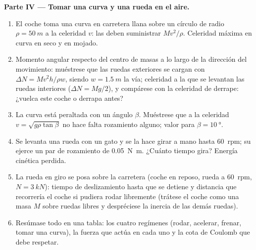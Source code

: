 \begin{problem}
\medskip
\noindent\textbf{Parte IV --- Tomar una curva y una rueda en el aire.}
\begin{enumerate}[resume]
  \item El coche toma una curva en carretera llana sobre un círculo de
        radio $\rho = \qty{50}{m}$ a la celeridad $v$: las  deben suministrar $Mv^2/\rho$. Celeridad máxima en
        curva en seco y en mojado.
  \item Momento angular respecto del centro de masas a lo largo de la
        dirección del movimiento: muéstrese que las ruedas exteriores se
        cargan con $\Delta N =
        Mv^2h/\rho w$, siendo $w = \qty{1.5}{m}$ la vía; celeridad a la que
        se levantan las ruedas interiores
        ($\Delta N = Mg/2$), y compárese con la celeridad de derrape:
        ¿vuelca este coche o derrapa antes?
  \item La curva está peraltada con un ángulo $\beta$. Muéstrese que a la
        celeridad $v = \sqrt{g\rho\tan\beta}$ no hace falta rozamiento
        alguno; valor para $\beta = \qty{10}{\degree}$.
  \item Se levanta una rueda con un gato y se la hace girar a mano hasta
        \qty{60}{rpm}; su  ejerce un par de rozamiento de
        \qty{0.05}{N.m}. ¿Cuánto tiempo gira? Energía cinética perdida.
  \item La rueda en giro se posa sobre la carretera (coche en reposo,
        rueda a \qty{60}{rpm}, $N = \qty{3}{kN}$): tiempo de deslizamiento
        hasta que se detiene y distancia que recorrería el coche si
        pudiera rodar libremente (trátese el coche como una masa $M$ sobre
        ruedas libres y despréciese la inercia de las demás ruedas).
  \item Resúmase todo en una tabla: los cuatro regímenes (rodar, acelerar,
        frenar, tomar una curva), la fuerza que actúa en cada uno y la
        cota de Coulomb que debe respetar.
\end{enumerate}
\end{problem}
